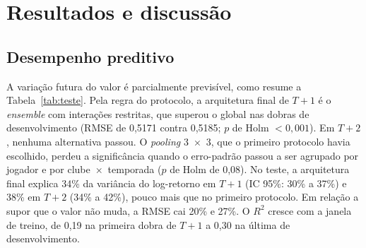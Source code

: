 \documentclass[article, 12pt, oneside, a4paper, english, brazil, section=TITLE]{abntex2}
\begin{document}
\section{Resultados e discussão}\label{sec:resultados}

\subsection{Desempenho preditivo}

A variação futura do valor é parcialmente previsível, como resume a Tabela~\ref{tab:teste}.
Pela regra do protocolo, a arquitetura final de $T+1$ é o \textit{ensemble} com interações restritas, que superou o global nas dobras de desenvolvimento (RMSE de 0,5171 contra 0,5185; $p$ de Holm $< 0{,}001$).
Em $T+2$, nenhuma alternativa passou.
O \textit{pooling} 3~×~3, que o primeiro protocolo havia escolhido, perdeu a significância quando o erro-padrão passou a ser agrupado por jogador e por clube~×~temporada ($p$ de Holm de 0,08).
No teste, a arquitetura final explica 34\% da variância do log-retorno em $T+1$ (IC 95\%: 30\% a 37\%) e 38\% em $T+2$ (34\% a 42\%), pouco mais que no primeiro protocolo.
Em relação a supor que o valor não muda, a RMSE cai 20\% e 27\%.
O $R^2$ cresce com a janela de treino, de 0,19 na primeira dobra de $T+1$ a 0,30 na última de desenvolvimento.
\end{document}
